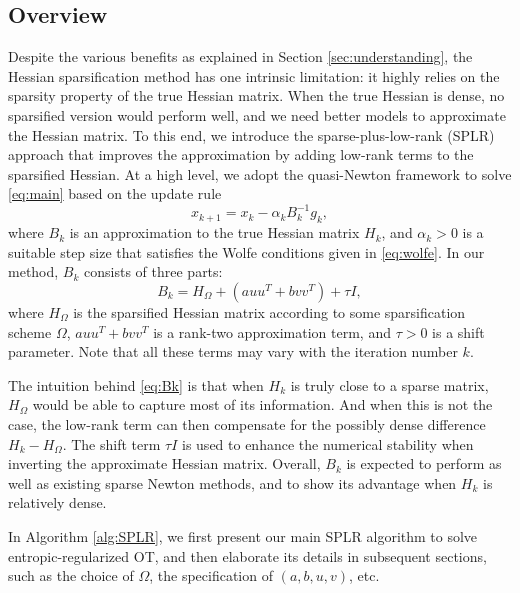 \documentclass{article}
\theoremstyle{plain}
\theoremstyle{definition}
\theoremstyle{remark}
\begin{document}
\subsection{Overview}
\label{subsec:overview}
Despite the various benefits as explained in Section \ref{sec:understanding}, the Hessian sparsification method has one intrinsic limitation: it highly relies on the sparsity property of the true Hessian matrix. When the true Hessian is dense, no sparsified version would perform well, and we need better models to approximate the Hessian matrix.
To this end, we introduce the sparse-plus-low-rank (SPLR) approach that improves the approximation by adding low-rank terms to the sparsified Hessian.
At a high level, we adopt the quasi-Newton framework to solve \eqref{eq:main} based on the update rule
\[
x_{k+1}=x_k-\alpha_k B_k^{-1}g_k,
\]
where $B_k$ is an approximation to the true Hessian matrix $H_k$, and $\alpha_k>0$ is a suitable step size that satisfies the Wolfe conditions given in \eqref{eq:wolfe}. In our method, $B_k$ consists of three parts:
\begin{equation}
\label{eq:Bk}
B_k=H_{\Omega}+(auu^T+bvv^T)+\tau I,
\end{equation}
where $H_{\Omega}$ is the sparsified Hessian matrix according to some sparsification scheme $\Omega$, $auu^T+bvv^T$ is a rank-two approximation term, and $\tau>0$ is a shift parameter. Note that all these terms may vary with the iteration number $k$.

The intuition behind \eqref{eq:Bk} is that when $H_k$ is truly close to a sparse matrix, $H_{\Omega}$ would be able to capture most of its information. And when this is not the case, the low-rank term can then compensate for the possibly dense difference $H_k-H_{\Omega}$. The shift term $\tau I$ is used to enhance the numerical stability when inverting the approximate Hessian matrix. Overall, $B_k$ is expected to perform as well as existing sparse Newton methods, and to show its advantage when $H_k$ is relatively dense.

In Algorithm \ref{alg:SPLR}, we first present our main SPLR algorithm to solve entropic-regularized OT, and then elaborate its details in subsequent sections, such as the choice of $\Omega$, the specification of $(a,b,u,v)$, etc.
\end{document}
